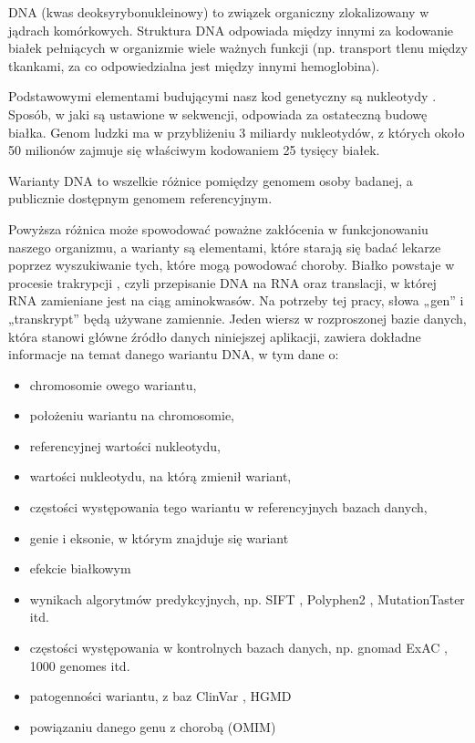 \documentclass[a4paper,12pt,twoside]{article}
\begin{document}
DNA (kwas deoksyrybonukleinowy) \cite{dna} to związek organiczny zlokalizowany w jądrach komórkowych.
Struktura DNA odpowiada między innymi za kodowanie białek \cite{geneticCode} \cite{dnaStrucDiv}  pełniących w organizmie wiele ważnych funkcji (np. transport tlenu między tkankami, za co
odpowiedzialna jest między innymi hemoglobina).

Podstawowymi elementami budującymi nasz kod genetyczny są
nukleotydy \cite{nukleotydy} \cite{nucleicAcids}. Sposób, w jaki są ustawione w sekwencji, odpowiada
za ostateczną budowę białka. Genom ludzki ma w przybliżeniu 3 miliardy
nukleotydów, z których około 50 milionów zajmuje się właściwym kodowaniem
25 tysięcy białek.

Warianty DNA to wszelkie różnice pomiędzy genomem osoby badanej,
a publicznie dostępnym genomem referencyjnym.

Powyższa różnica może spowodować poważne
zakłócenia w funkcjonowaniu naszego organizmu, a warianty
są elementami, które starają się badać
lekarze poprzez wyszukiwanie tych, które mogą powodować choroby.
Białko powstaje w procesie trakrypcji \cite{transkrypcja}, czyli przepisanie DNA na RNA oraz translacji, w której RNA zamieniane jest na ciąg aminokwasów.
Na potrzeby tej pracy, słowa „gen” i „transkrypt” będą używane zamiennie.
Jeden wiersz w rozproszonej bazie danych, która stanowi główne źródło danych niniejszej aplikacji, zawiera dokładne informacje na temat danego wariantu DNA, w tym dane o:

\begin{itemize}
\item chromosomie owego wariantu,
\item położeniu wariantu na chromosomie,
\item referencyjnej wartości nukleotydu,
\item wartości nukleotydu, na którą zmienił wariant,
\item częstości występowania tego wariantu w referencyjnych bazach danych,
\item genie i eksonie, w którym znajduje się wariant
\item efekcie białkowym
\item wynikach algorytmów predykcyjnych, np. SIFT \cite{sift}, Polyphen2 \cite{polyphen2}, MutationTaster \cite{MutationTaster2} itd.
\item częstości występowania w kontrolnych bazach danych, np. gnomad ExAC \cite{exac} \cite{exacCite}, 1000 genomes \cite{1000} itd.
\item patogenności wariantu, z baz ClinVar \cite{clin}, HGMD \cite{hgmd}
\item powiązaniu danego genu z chorobą (OMIM) \cite{omim}
\end{itemize}
\end{document}
